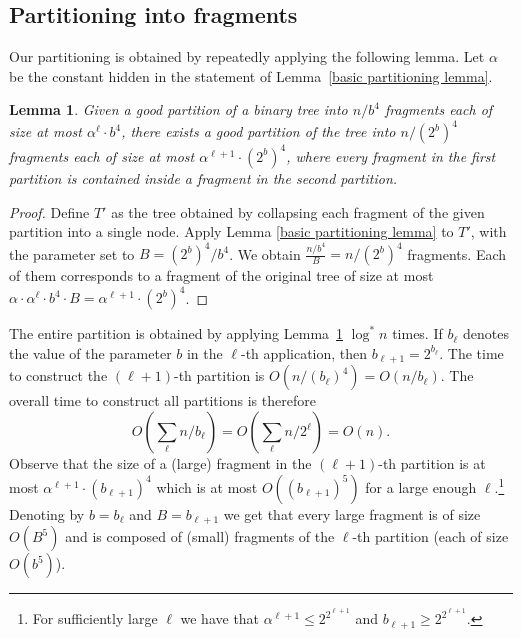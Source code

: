 \documentclass[11pt,a4paper]{article}
\newtheorem{lemma}{Lemma}
\theoremstyle{definition}
\theoremstyle{remark}
\begin{document}
\subsection{Partitioning into fragments}\label{section:partioioning}
Our partitioning is obtained by repeatedly applying the following lemma. Let $\alpha$ be the constant hidden in the statement of Lemma~\ref{basic partitioning lemma}.

\begin{lemma}\label{good partition refinement lemma}
Given a good partition of a binary tree into $n/b^{4}$ fragments each of size at most $\alpha^{\ell}\cdot b^{4}$, there
exists a good partition of the tree into $n/(2^b)^{4}$ fragments each of size at most $\alpha^{\ell+1}\cdot (2^{b})^{4}$,
where every fragment in the first partition is contained inside a fragment in the second partition.
\end{lemma}
\begin{proof}
Define $T'$ as the tree obtained by collapsing each fragment of the given partition into a single node. Apply 
Lemma \ref{basic partitioning lemma} to $T'$, with the parameter set to $B= {(2^{b})^{4}}/{b^{4}}$. We obtain
$\frac{n/b^4}{B}=n/(2^{b})^{4}$ fragments. Each of them corresponds to a fragment of the original tree of size at
most $\alpha\cdot \alpha^{\ell}\cdot b^{4}\cdot B = \alpha^{\ell+1}\cdot (2^{b})^{4}$.
\end{proof}

\noindent The entire partition is obtained by applying Lemma~\ref{good partition refinement lemma} $\log^{*}n$ times. 
If $b_{\ell}$ denotes the value of the parameter $b$ in the $\ell$-th application, then  $b_{\ell+1}=2^{b_{\ell}}$. The time to construct the $(\ell+1)$-th partition is $O(n/(b_{\ell})^{4})=O(n/b_{\ell})$. The overall time to construct all partitions is therefore 
$$ O(\sum_{\ell} {n}/{b_{\ell}}) = O(\sum_{\ell} {n}/{2^{\ell}}) = O(n).$$
Observe that the size of a (large) fragment in the $(\ell+1)$-th partition is at most $\alpha^{\ell+1} \cdot (b_{\ell+1})^{4}$ which is at most $O((b_{\ell+1})^5)$ for a large enough $\ell$.\footnote{For sufficiently large $\ell$ we have that $\alpha^{\ell+1}\leq 2^{2^{\ell+1}}$ and $b_{\ell+1}\geq 2^{2^{\ell+1}}$.}  Denoting by $b=b_{\ell}$ and $B=b_{\ell+1}$  we get that every large fragment is of size $O(B^5)$ and is composed of (small) fragments of the $\ell$-th partition (each of size $O(b^5)$). 
\end{document}
